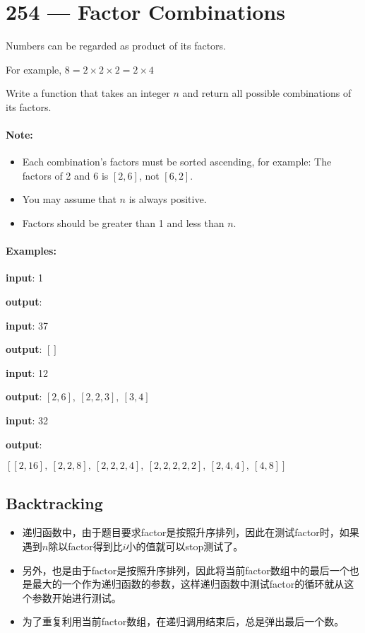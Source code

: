 \section{254 --- Factor Combinations}
Numbers can be regarded as product of its factors. 

For example, $8 = 2 \times 2 \times 2 = 2\times 4$

Write a function that takes an integer $n$ and return all possible combinations of its factors.

\paragraph{Note: }

\begin{itemize}
\item Each combination's factors must be sorted ascending, for example: The factors of 2 and 6 is $[2, 6]$, not $[6, 2]$.
\item You may assume that $n$ is always positive.
\item Factors should be greater than 1 and less than $n$.
\end{itemize}
 

\paragraph{Examples: }
\begin{flushleft}
\textbf{input}: 1

\textbf{output}: \fcj{[]}

\textbf{input}: 37

\textbf{output}: $[]$

\textbf{input}: 12

\textbf{output}: $[2,6], \ [2, 2, 3], \ [3, 4]$

\textbf{input}: 32

\textbf{output}:

$[[2, 16],\  [2, 2, 8],\  [2, 2, 2, 4],\ [2, 2, 2, 2, 2],\   [2, 4, 4],\ [4, 8]]$
\end{flushleft}

\subsection{Backtracking}
\begin{itemize}
\item 递归函数中，由于题目要求factor是按照升序排列，因此在测试factor时，如果遇到$n$除以factor得到比$i$小的值就可以stop测试了。
\item 另外，也是由于factor是按照升序排列，因此将当前factor数组中的最后一个也是最大的一个作为递归函数的参数，这样递归函数中测试factor的循环就从这个参数开始进行测试。
\item 为了重复利用当前factor数组，在递归调用结束后，总是弹出最后一个数。
\end{itemize}

